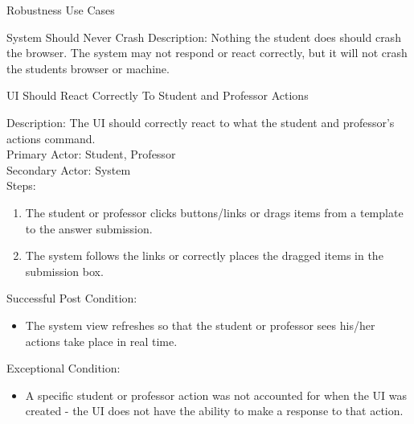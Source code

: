 \documentclass{article}
\begin{document}
\begin{section}{Robustness Use Cases}
\begin{subsection}{System Should Never Crash}
    Description: Nothing the student does should crash the browser. The system may not respond or react correctly, but it will not crash the students browser or machine.
    \end{subsection}
    \begin{subsection}{ UI Should React Correctly To Student and Professor Actions}
    
    Description: The UI should correctly react to what the student and professor’s actions command.\\
    Primary Actor: Student, Professor\\
    Secondary Actor: System\\
    Steps:
        \begin{enumerate}
            \item The student or professor clicks buttons/links or drags items from a template to the answer submission.
            \item The system follows the links or correctly places the dragged items in the submission box.
            \end{enumerate}
    Successful Post Condition: 
        \begin{itemize}
            \item The system view refreshes so that the student or professor sees his/her actions take place in real time.
        \end{itemize}
    Exceptional Condition:
        \begin{itemize}
            \item A specific student or professor action was not accounted for when the UI was created - the UI does not have the ability to make a response to that action.
        \end{itemize}
    \end{subsection}
    
\end{section}

\end{document}
